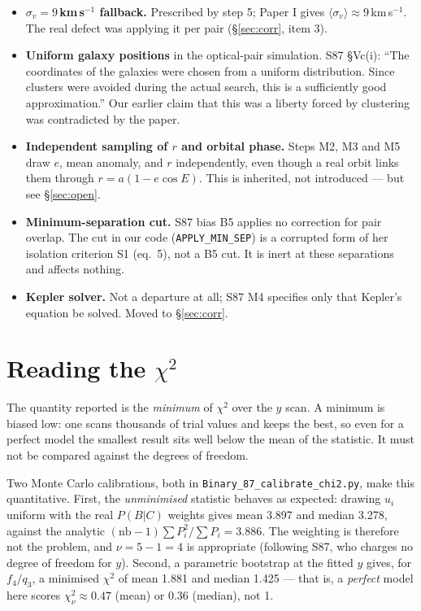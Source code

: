 \documentclass[11pt]{article}
\begin{document}
\begin{itemize}\itemsep3pt
  \item \textbf{$\sigma_v = 9$\,km\,s$^{-1}$ fallback.} Prescribed by step 5;
        Paper I gives $\langle\sigma_v\rangle \approx 9$\,km\,s$^{-1}$. The
        real defect was applying it per pair (\S\ref{sec:corr}, item 3).
  \item \textbf{Uniform galaxy positions} in the optical-pair simulation. S87
        \S Vc(i): ``The coordinates of the galaxies were chosen from a uniform
        distribution. Since clusters were avoided during the actual search,
        this is a sufficiently good approximation.'' Our earlier claim that
        this was a liberty forced by clustering was contradicted by the paper.
  \item \textbf{Independent sampling of $r$ and orbital phase.} Steps M2, M3
        and M5 draw $e$, mean anomaly, and $r$ independently, even though a
        real orbit links them through $r = a(1-e\cos E)$. This is inherited,
        not introduced --- but see \S\ref{sec:open}.
  \item \textbf{Minimum-separation cut.} S87 bias B5 applies no correction for
        pair overlap. The cut in our code
        (\texttt{APPLY\_MIN\_SEP}) is a corrupted form of her isolation
        criterion S1 (eq.~5), not a B5 cut. It is inert at these separations
        and affects nothing.
  \item \textbf{Kepler solver.} Not a departure at all; S87 M4 specifies only
        that Kepler's equation be solved. Moved to \S\ref{sec:corr}.
\end{itemize}

\section{Reading the \texorpdfstring{$\chi^2$}{chi-squared}}
\label{sec:chi2}

The quantity reported is the \emph{minimum} of $\chi^2$ over the $y$ scan. A
minimum is biased low: one scans thousands of trial values and keeps the best,
so even for a perfect model the smallest result sits well below the mean of the
statistic. It must not be compared against the degrees of freedom.

Two Monte Carlo calibrations, both in
\texttt{Binary\_87\_calibrate\_chi2.py}, make this quantitative. First, the
\emph{unminimised} statistic behaves as expected: drawing $u_i$ uniform with the
real $P(B|C)$ weights gives mean 3.897 and median 3.278, against the analytic
$(\mathrm{nb}-1)\sum P_i^2/\sum P_i = 3.886$. The weighting is therefore not the
problem, and $\nu = 5-1 = 4$ is appropriate (following S87, who charges no
degree of freedom for $y$). Second, a parametric bootstrap at the fitted $y$
gives, for $f_4/q_3$, a minimised $\chi^2$ of mean 1.881 and median 1.425 ---
that is, a \emph{perfect} model here scores $\chi^2_\nu \approx 0.47$ (mean) or
$0.36$ (median), not 1.
\end{document}
